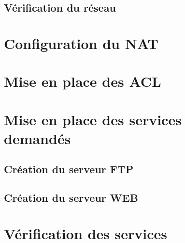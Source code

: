\documentclass[12pt, a4paper]{article}
\begin{document}
		\subsection{Vérification du réseau}

	\section{Configuration du NAT}

	\section{Mise en place des ACL}

	\section{Mise en place des services demandés}

		\subsection{Création du serveur FTP}

		\subsection{Création du serveur WEB}
	
	\section{Vérification des services}
\end{document}
